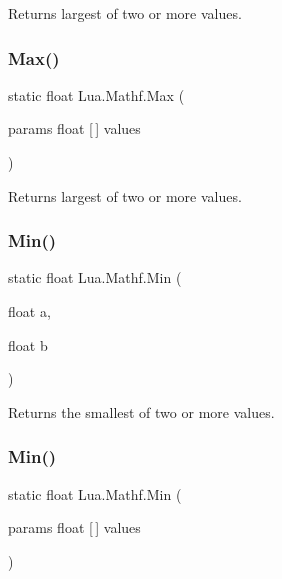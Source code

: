 Returns largest of two or more values. 

\mbox{\label{class_lua_1_1_mathf_ab683c60c60e63553655e8727a55f3e61}} 
\subsubsection{\texorpdfstring{Max()}{Max()}\hspace{0.1cm}{\footnotesize\ttfamily [2/2]}}
{\footnotesize\ttfamily static float Lua.\+Mathf.\+Max (\begin{DoxyParamCaption}\item[{params float \mbox{[}$\,$\mbox{]}}]{values }\end{DoxyParamCaption})\hspace{0.3cm}{\ttfamily [static]}}



Returns largest of two or more values. 

\mbox{\label{class_lua_1_1_mathf_acc164cac8453f2551303265e346f4969}} 
\subsubsection{\texorpdfstring{Min()}{Min()}\hspace{0.1cm}{\footnotesize\ttfamily [1/2]}}
{\footnotesize\ttfamily static float Lua.\+Mathf.\+Min (\begin{DoxyParamCaption}\item[{float}]{a,  }\item[{float}]{b }\end{DoxyParamCaption})\hspace{0.3cm}{\ttfamily [static]}}



Returns the smallest of two or more values. 

\mbox{\label{class_lua_1_1_mathf_a1d580ef078dacb928fb6df039df2281b}} 
\subsubsection{\texorpdfstring{Min()}{Min()}\hspace{0.1cm}{\footnotesize\ttfamily [2/2]}}
{\footnotesize\ttfamily static float Lua.\+Mathf.\+Min (\begin{DoxyParamCaption}\item[{params float \mbox{[}$\,$\mbox{]}}]{values }\end{DoxyParamCaption})\hspace{0.3cm}{\ttfamily [static]}}



